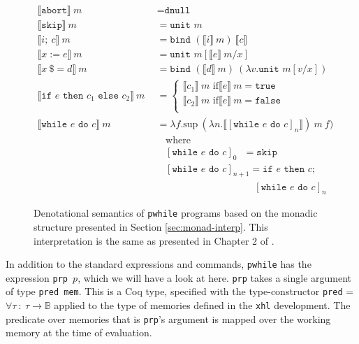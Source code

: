 \documentclass[11pt, leqno, titlepage]{article}
\theoremstyle{definition}
\begin{document}
\begin{figure}[h]
  \begin{align*}
    \llbracket \texttt{abort} \rrbracket~m
    &~~= \texttt{dnull}\\
    \llbracket \texttt{skip} \rrbracket~m
    &~~= \texttt{unit }m\\
    \llbracket i;~c \rrbracket~m
    &~~= \texttt{bind }(\llbracket i \rrbracket~m) ~
      \llbracket c \rrbracket \\
    \llbracket x := e \rrbracket~m
    &~~= \texttt{unit }m [\llbracket e \rrbracket~m / x]\\
    \llbracket x~\$= d \rrbracket~m
    &~~= \texttt{bind } (\llbracket d \rrbracket~m) ~(\lambda v.\texttt{unit }m[v/x])
    \\ 
    \llbracket \texttt{if $e$ then $c_1$ else $c_2$} \rrbracket~m
    &~~= \begin{cases} \llbracket c_1 \rrbracket~m\text{ if} \llbracket e
           \rrbracket~m = \texttt{true}\\ 
           \llbracket c_2 \rrbracket~m\text{ if} \llbracket e \rrbracket~m =
           \texttt{false}\\ 
         \end{cases}\\
    \llbracket \texttt{while $e$ do $c$} \rrbracket~m
    &~~= \lambda f.\text{sup}~(\lambda n. \llbracket [\texttt{while $e$ do }c]_n
      \rrbracket)~ m~f)\\
    & ~~~~~~ \text{where}\\
    & ~~~~~~ [\texttt{while $e$ do }c]_0 ~~~ = \texttt{skip}\\
    & ~~~~~~ [\texttt{while $e$ do }c]_{n+1} = \texttt{if $e$ then $c$;} \\
    & \hspace{125pt}[\texttt{while $e$ do }c]_n
  \end{align*}
  \caption{Denotational semantics of \texttt{pwhile} programs based on the monadic
    structure presented in Section \ref{sec:monad-interp}. This interpretation is the
    same as presented in Chapter 2 of \cite{zanella}.}
  \label{fig:pwhile-sem}
\end{figure}


In addition to the standard expressions and commands, \texttt{pwhile} has the
expression \texttt{prp $p$}, which we will have a look at here.
\texttt{prp} takes a single argument of type \texttt{pred mem}. This is a Coq type,
specified with the type-constructor \texttt{pred} = $\forall \tau~:~\tau \to
\mathbb{B}$ applied to the type of memories defined in the \texttt{xhl}
development. The predicate over memories that is \texttt{prp}'s argument is mapped
over the working memory at the time of evaluation.
\end{document}
